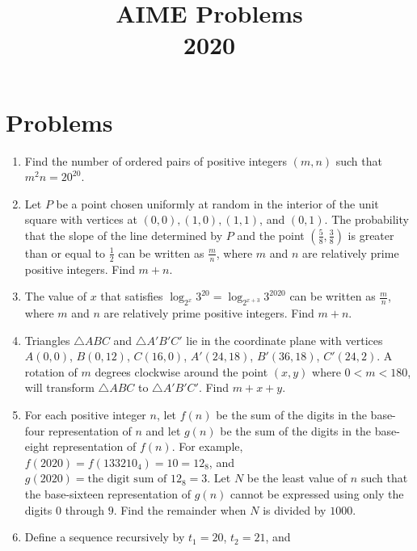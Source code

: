 \documentclass{article}
\title{AIME Problems \\ 2020}
\date{}
\begin{document}
\maketitle\thispagestyle{fancy}\newpage\section*{Problems}\begin{enumerate}[label=\arabic*., itemsep=0.5em]\item Find the number of ordered pairs of positive integers $(m,n)$ such that ${m^2n = 20 ^{20}}$.\par \vspace{0.5em}\item Let $P$ be a point chosen uniformly at random in the interior of the unit square with vertices at $(0,0), (1,0), (1,1)$, and $(0,1)$. The probability that the slope of the line determined by $P$ and the point $\left(\frac58, \frac38 \right)$ is greater than or equal to $\frac12$ can be written as $\frac{m}{n}$, where $m$ and $n$ are relatively prime positive integers. Find $m+n$.\par \vspace{0.5em}\item The value of $x$ that satisfies $\log_{2^x} 3^{20} = \log_{2^{x+3}} 3^{2020}$ can be written as $\frac{m}{n}$, where $m$ and $n$ are relatively prime positive integers. Find $m+n$.\par \vspace{0.5em}\item Triangles $\triangle ABC$ and $\triangle A'B'C'$ lie in the coordinate plane with vertices $A(0,0)$, $B(0,12)$, $C(16,0)$, $A'(24,18)$, $B'(36,18)$, $C'(24,2)$. A rotation of $m$ degrees clockwise around the point $(x,y)$ where $0<m<180$, will transform $\triangle ABC$ to $\triangle A'B'C'$. Find $m+x+y$.\par \vspace{0.5em}\item For each positive integer $n$, let $f(n)$ be the sum of the digits in the base-four representation of $n$ and let $g(n)$ be the sum of the digits in the base-eight representation of $f(n)$. For example, $f(2020) = f(133210_{\text{4}}) = 10 = 12_{\text{8}}$, and $g(2020) = \text{the digit sum of }12_{\text{8}} = 3$. Let $N$ be the least value of $n$ such that the base-sixteen representation of $g(n)$ cannot be expressed using only the digits $0$ through $9$. Find the remainder when $N$ is divided by $1000$.\par \vspace{0.5em}\item Define a sequence recursively by $t_1 = 20$, $t_2 = 21$, and

\end{enumerate}
\end{document}
